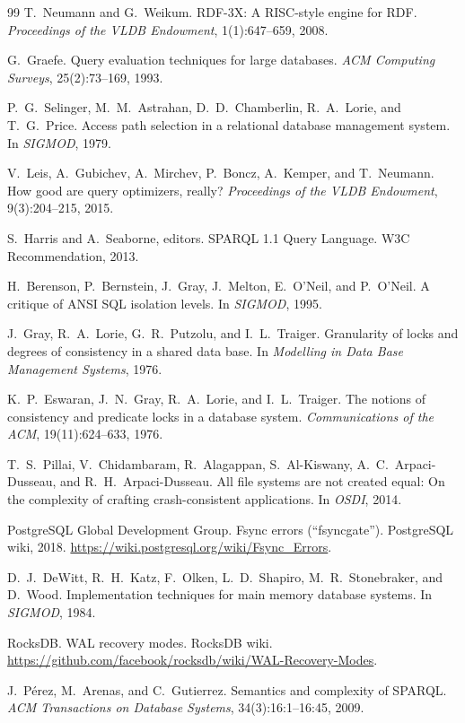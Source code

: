 \begin{thebibliography}{99}
 T.~Neumann and G.~Weikum. RDF-3X: A RISC-style engine for RDF. \emph{Proceedings of the VLDB Endowment}, 1(1):647--659, 2008.

 G.~Graefe. Query evaluation techniques for large databases. \emph{ACM Computing Surveys}, 25(2):73--169, 1993.

 P.~G.~Selinger, M.~M.~Astrahan, D.~D.~Chamberlin, R.~A.~Lorie, and T.~G.~Price. Access path selection in a relational database management system. In \emph{SIGMOD}, 1979.

 V.~Leis, A.~Gubichev, A.~Mirchev, P.~Boncz, A.~Kemper, and T.~Neumann. How good are query optimizers, really? \emph{Proceedings of the VLDB Endowment}, 9(3):204--215, 2015.

 S.~Harris and A.~Seaborne, editors. SPARQL 1.1 Query Language. W3C Recommendation, 2013.

 H.~Berenson, P.~Bernstein, J.~Gray, J.~Melton, E.~O'Neil, and P.~O'Neil. A critique of ANSI SQL isolation levels. In \emph{SIGMOD}, 1995.

 J.~Gray, R.~A.~Lorie, G.~R.~Putzolu, and I.~L.~Traiger. Granularity of locks and degrees of consistency in a shared data base. In \emph{Modelling in Data Base Management Systems}, 1976.

 K.~P.~Eswaran, J.~N.~Gray, R.~A.~Lorie, and I.~L.~Traiger. The notions of consistency and predicate locks in a database system. \emph{Communications of the ACM}, 19(11):624--633, 1976.

 T.~S.~Pillai, V.~Chidambaram, R.~Alagappan, S.~Al-Kiswany, A.~C.~Arpaci-Dusseau, and R.~H.~Arpaci-Dusseau. All file systems are not created equal: On the complexity of crafting crash-consistent applications. In \emph{OSDI}, 2014.

 PostgreSQL Global Development Group. Fsync errors (``fsyncgate''). PostgreSQL wiki, 2018. \url{https://wiki.postgresql.org/wiki/Fsync_Errors}.

 D.~J.~DeWitt, R.~H.~Katz, F.~Olken, L.~D.~Shapiro, M.~R.~Stonebraker, and D.~Wood. Implementation techniques for main memory database systems. In \emph{SIGMOD}, 1984.

 RocksDB. WAL recovery modes. RocksDB wiki. \url{https://github.com/facebook/rocksdb/wiki/WAL-Recovery-Modes}.

 J.~P\'erez, M.~Arenas, and C.~Gutierrez. Semantics and complexity of SPARQL. \emph{ACM Transactions on Database Systems}, 34(3):16:1--16:45, 2009.


\end{thebibliography}

